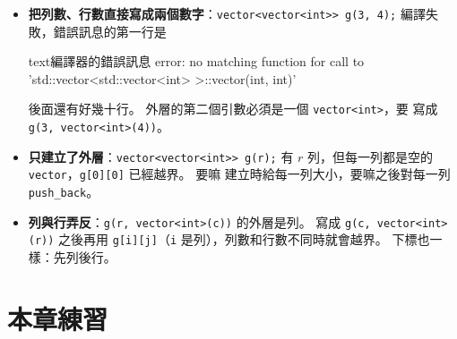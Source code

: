 \begin{itemize}
\item \textbf{把列數、行數直接寫成兩個數字}：\texttt{vector<vector<int>>
g(3, 4);} 編譯失敗，錯誤訊息的第一行是
\begin{code}{text}{編譯器的錯誤訊息}
error: no matching function for call to 'std::vector<std::vector<int> >::vector(int, int)'
\end{code}
後面還有好幾十行。 外層的第二個引數必須是一個 \texttt{vector<int>}，要
寫成 \texttt{g(3, vector<int>(4))}。
\item \textbf{只建立了外層}：\texttt{vector<vector<int>> g(r);} 有 $r$
列，但每一列都是空的 \texttt{vector}，\texttt{g[0][0]} 已經越界。 要嘛
建立時給每一列大小，要嘛之後對每一列 \texttt{push\_back}。
\item \textbf{列與行弄反}：\texttt{g(r, vector<int>(c))} 的外層是列。
寫成 \texttt{g(c, vector<int>(r))} 之後再用 \texttt{g[i][j]}（\texttt{i}
是列），列數和行數不同時就會越界。 下標也一樣：先列後行。
\end{itemize}

\section{本章練習}
\label{sec:ch3-exercises}

